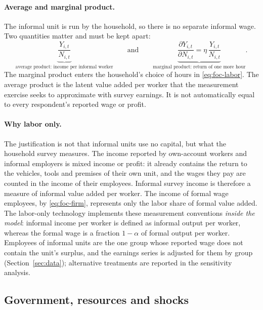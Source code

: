 \paragraph{Average and marginal product.} The informal unit is run by the household, so there is no separate informal wage. Two quantities matter and must be kept apart:
\begin{equation}
\underbrace{\frac{Y_{i,t}}{N_{i,t}}}_{\text{average product: income per informal worker}}
\qquad\text{and}\qquad
\underbrace{\frac{\partial Y_{i,t}}{\partial N_{i,t}} = \eta\,\frac{Y_{i,t}}{N_{i,t}}}_{\text{marginal product: return of one more hour}} .
\label{eq:avg-marginal}
\end{equation}
The marginal product enters the household's choice of hours in \eqref{eq:foc-labor}. The average product is the latent value added per worker that the measurement exercise seeks to approximate with survey earnings. It is not automatically equal to every respondent's reported wage or profit.

\paragraph{Why labor only.} The justification is not that informal units use no capital, but what the household survey measures. The income reported by own-account workers and informal employers is mixed income or profit: it already contains the return to the vehicles, tools and premises of their own unit, and the wages they pay are counted in the income of their employees. Informal survey income is therefore a measure of informal value added per worker. The income of formal wage employees, by \eqref{eq:foc-firm}, represents only the labor share of formal value added. The labor-only technology implements these measurement conventions \emph{inside the model}: informal income per worker is defined as informal output per worker, whereas the formal wage is a fraction $1-\alpha$ of formal output per worker. Employees of informal units are the one group whose reported wage does not contain the unit's surplus, and the earnings series is adjusted for them by group (Section~\ref{sec:data}); alternative treatments are reported in the sensitivity analysis.

\subsection{Government, resources and shocks}

